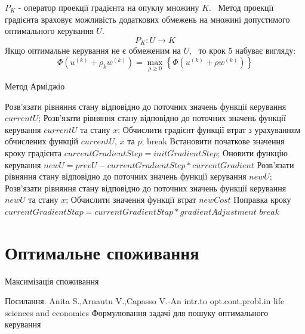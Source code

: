 \documentclass[a4paper,12pt]{extreport}
\begin{document}
$P_K$ - оператор проекції градієнта на опуклу множину $K$.  Метод проекції градієнта враховує можливість додаткових обмежень на множині допустимого оптимального керування $U$. $$
P_K: U \rightarrow K
$$
    Якщо оптимальне керування не є обмеженим на $U$,  то крок 5 набуває вигляду:
$$
    \Phi\left(u^{(k)}+\rho_k w^{(k)}\right)=\max _{\rho \geq 0}\left\{\Phi\left(u^{(k)}+\rho w^{(k)}\right)\right\}
$$
\begin{algorithm}
	\caption*{Метод Арміджіо} 
	\begin{algorithmic}[1]
            \State Розв'язати рівняння стану відповідно до поточних значень функції керування $currentU$;
            \State Розв'язати рівняння стану відповідно до поточних значень функції керування $currentU$ та стану $x$;
            \State Обчислити градієнт функції втрат з урахуванням обчислених функцій $currentU$, $x$ та $p$;
                \State break
            \EndIf
            \State Встановити початкове значення кроку градієнта $currentGradientStep=initGradientStep$;
                \State Оновити функцію керування $ newU = prevU - currentGradientStep * currentGradient $
                \State Розв'язати рівняння стану відповідно до поточних значень функції керування $newU$;
                \State Розв'язати рівняння стану відповідно до поточних значень функції керування $newU$ та стану $x$;
                \State Обчислити значення функції втрат $ newCost $
                    \State Поправка кроку $currentGradientStap = currentGradientStap * gradientAdjustment $
                \Else
                    \State $ break $
                \EndIf
                
			\EndFor
            
		
        \EndWhile
	\end{algorithmic} 
\end{algorithm}

\section{Оптимальне споживання}
Максимізація споживання

Посилання. Anita S.,Arnautu V.,Capasso V.-An intr.to opt.cont.probl.in life sciences and economics
Формулювання задачі для пошуку оптимального керування
\end{document}
